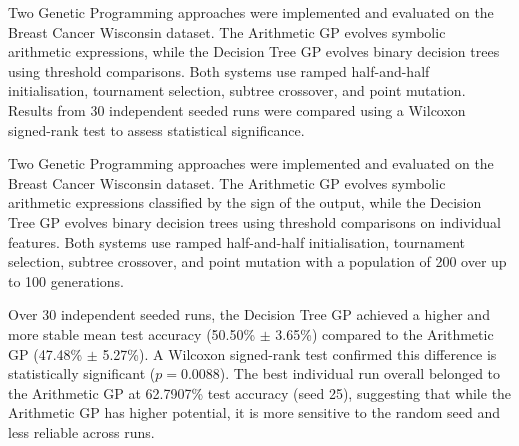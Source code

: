 \documentclass[12pt,a4paper]{article}
\begin{document}
Two Genetic Programming approaches were implemented and evaluated on the Breast Cancer Wisconsin dataset. The Arithmetic GP evolves symbolic arithmetic expressions, while the Decision Tree GP evolves binary decision trees using threshold comparisons. Both systems use ramped half-and-half initialisation, tournament selection, subtree crossover, and point mutation. Results from 30 independent seeded runs were compared using a Wilcoxon signed-rank test to assess statistical significance.

Two Genetic Programming approaches were implemented and evaluated on the Breast Cancer Wisconsin dataset. The Arithmetic GP evolves symbolic arithmetic expressions classified by the sign of the output, while the Decision Tree GP evolves binary decision trees using threshold comparisons on individual features. Both systems use ramped half-and-half initialisation, tournament selection, subtree crossover, and point mutation with a population of 200 over up to 100 generations.

Over 30 independent seeded runs, the Decision Tree GP achieved a higher and more stable mean test accuracy (50.50\% $\pm$ 3.65\%) compared to the Arithmetic GP (47.48\% $\pm$ 5.27\%). A Wilcoxon signed-rank test confirmed this difference is statistically significant ($p = 0.0088$). The best individual run overall belonged to the Arithmetic GP at 62.7907\% test accuracy (seed 25), suggesting that while the Arithmetic GP has higher potential, it is more sensitive to the random seed and less reliable across runs.
\end{document}

